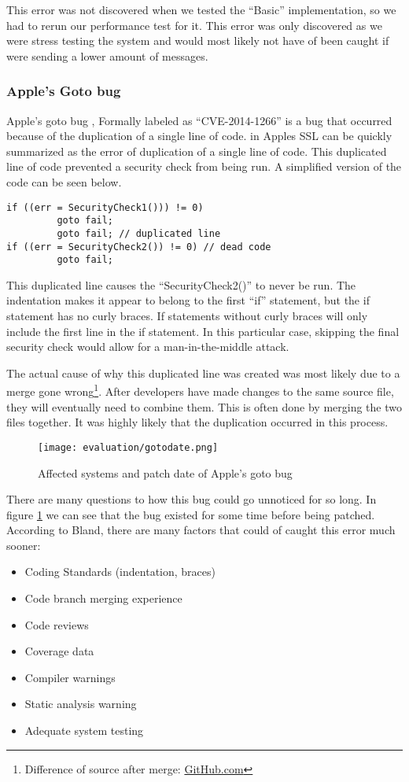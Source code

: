 This error was not discovered when we tested the ``Basic'' implementation, so we had to rerun our performance test for it. This error was only discovered as we were stress testing the system and would most likely not have of been caught if were sending a lower amount of messages.

\subsubsection{Apple's Goto bug}
Apple's goto bug , Formally labeled as ``CVE-2014-1266'' \cite{bland2014finding} is a bug that occurred because of the duplication of a single line of code.  in Apples SSL can be quickly summarized as the error of duplication of a single line of code. This duplicated line of code prevented a security check from being run. A simplified version of the code can be seen below.

\begin{lstlisting}[style=myScalastyle]
if ((err = SecurityCheck1())) != 0)
         goto fail;
         goto fail; // duplicated line
if ((err = SecurityCheck2()) != 0) // dead code
         goto fail;
\end{lstlisting}

This duplicated line causes the ``SecurityCheck2()'' to never be run. The indentation makes it appear to belong to the first ``if'' statement, but the if statement has no curly braces. If statements without curly braces will only include the first line in the if statement.  In this particular case, skipping the final security check would allow for a man-in-the-middle attack.

The actual cause of why this duplicated line was created was most likely due to a merge gone wrong\footnote{Difference of source after merge: \href{https://gist.github.com/hongrich/9176925}{GitHub.com}}. After developers have made changes to the same source file, they will eventually need to combine them. This is often done by merging the two files together. It was highly likely that the duplication occurred in this process.
\begin{figure}[H]
  \centering
  \texttt{[image: evaluation/gotodate.png]}
  \caption{Affected systems and patch date of Apple's goto bug \cite{bland2014finding}}
  \label{fig:gotofail}
\end{figure}

There are many questions to how this bug could go unnoticed for so long. In figure \ref{fig:gotofail} we can see that the bug existed for some time before being patched. According to Bland, there are many factors that could of caught this error much sooner:
\begin{itemize}
  \item Coding Standards (indentation, braces)
  \item Code branch merging experience
  \item Code reviews
  \item Coverage data
  \item Compiler warnings
  \item Static analysis warning
  \item Adequate system testing
\end{itemize}

